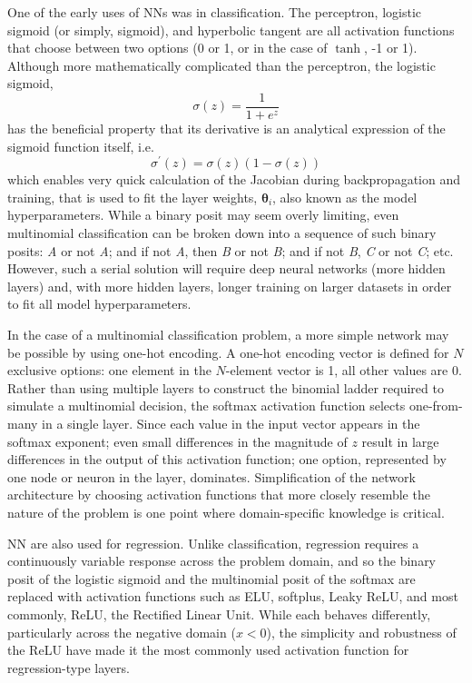 One of the early uses of NNs was in classification. The perceptron, logistic sigmoid (or simply, sigmoid), and hyperbolic tangent are all activation functions that choose between two options (0 or 1, or in the case of $\tanh$, -1 or 1). Although more mathematically complicated than the perceptron, the logistic sigmoid,
\begin{equation}
	\sigma(z) = \frac{1}{1 + e^z}
	\label{sigmaz}
\end{equation}
has the beneficial property that its derivative is an analytical expression of the sigmoid function itself, i.e.
\begin{equation}
	\sigma^\prime(z) = \sigma(z) \left( 1 - \sigma(z) \right)
	\label{sigmaprime}
\end{equation}
which enables very quick calculation of the Jacobian during backpropagation and training, that is used to fit the layer weights, $\boldsymbol \theta_i$, also known as the model hyperparameters. While a binary posit may seem overly limiting, even multinomial classification can be broken down into a sequence of such binary posits: \textit{A} or not \textit{A}; and if not \textit{A}, then \textit{B} or not \textit{B}; and if not \textit{B}, \textit{C} or not \textit{C}; etc. However, such a serial solution will require deep neural networks (more hidden layers) and, with more hidden layers, longer training on larger datasets in order to %
fit all model hyperparameters.

In the case of a multinomial classification problem, a more simple network may be possible by using one-hot encoding. A one-hot encoding vector is defined for $N$ exclusive options: one element in the $N$-element vector is 1, all other values are 0. Rather than using multiple layers to construct the binomial ladder required to simulate a multinomial decision, the softmax activation function selects one-from-many in a single layer. Since each value in the input vector appears in the softmax exponent; even small differences in the magnitude of $z$ result in large differences in the output of this activation function; one option, represented by one node or neuron in the layer, dominates. Simplification of the network architecture by choosing activation functions that more closely resemble the nature of the problem is one point where domain-specific knowledge is critical.

NN are also used for regression. Unlike classification, regression requires a continuously variable response across the problem domain, and so the binary posit of the logistic sigmoid and the multinomial posit of the softmax are replaced with activation functions such as ELU, softplus, Leaky ReLU, and most commonly, ReLU, the Rectified Linear Unit. While each behaves differently, particularly across the negative domain ($x < 0$), the simplicity and robustness of the ReLU have made it the most commonly used activation function for regression-type layers.

